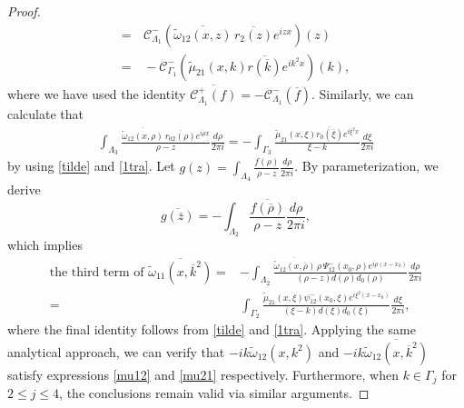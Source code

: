 \documentclass[preprint,compress,12pt]{elsarticle}
\numberwithin{equation}{section}
\begin{document}
\begin{proof}
\begin{equation*}
\begin{aligned}
=&\,\mathcal{C}_{\Lambda_{1}}^{-}\left(\overline{\tilde{\omega}_{12}(x,z)}\,\overline{r_{2}(z)}e^{izx}\right)(z)\\
=&\,-\mathcal{C}_{\Gamma_{1}}^{-}(\tilde{\mu}_{21}(x,k)\overline{r(\overline{k})}e^{ik^{2}x})(k),
\end{aligned}
\end{equation*}
where we have used the identity $\overline{\mathcal{C}_{\Lambda_{1}}^{+}(f)}=-\mathcal{C}_{\Lambda_{1}}^{-}(\overline{f})$. Similarly, we can calculate that
\begin{equation*}
\begin{aligned}
\int_{\Lambda_{3}}\frac{\overline{\tilde{\omega}_{12}(x,\rho)} \,\overline{r_{02}(\rho)}e^{i\rho x}}{\rho-z}\frac{d\rho}{2\pi i}
=-\int_{\Gamma_{3}}\frac{\tilde{\mu}_{21}(x,\xi) \overline{r_{0}(\overline{\xi})}e^{i\xi^{2} x}}{\xi-k}\frac{d\xi}{2\pi i}
\end{aligned}
\end{equation*}
by using \eqref{tilde} and \eqref{1tra}. Let $g(z)=\int_{\Lambda_{4}}\frac{f(\rho)}{\rho-z}\frac{d\rho}{2\pi i}$. By parameterization, we derive
\begin{equation*}
\overline{g(\overline{z})}=-\int_{\Lambda_{2}}\frac{\overline{f(\overline{\rho})}}{\rho-z}\frac{d\rho}{2\pi i},
\end{equation*}
which implies
\begin{equation*}
\begin{aligned}
\text{the third term of }\overline{\tilde{\omega}_{11}(x,\overline{k}^{2})}
=&-\int_{\Lambda_{2}}\frac{\overline{\tilde{\omega}_{12}(x,\overline{\rho})}\, \rho \, \Psi_{12}^{-}(x_{0},\rho) e^{i\rho (x-x_{0})}}{(\rho-z)d(\rho)d_{0}(\rho)}\frac{d\rho}{2\pi i}\\
=&\int_{\Gamma_{2}}\frac{\tilde{\mu}_{21}(x,\xi) \psi_{12}^{-}(x_{0},\xi) e^{i\xi^{2} (x-x_{0})}}{(\xi-k)d(\xi)d_{0}(\xi)}\frac{d\xi}{2\pi i},
\end{aligned}
\end{equation*}
where the final identity follows from \eqref{tilde} and \eqref{1tra}. Applying the same analytical approach, we can verify that $-ik\tilde{\omega}_{12}(x,k^{2})$ and $-ik\overline{\tilde{\omega}_{12}(x,\overline{k}^{2})}$ satisfy expressions \eqref{mu12} and \eqref{mu21} respectively. Furthermore, when $k\in \Gamma_{j}$ for $2\leq j\leq4$, the conclusions remain valid via similar arguments.
\end{proof}
\end{document}
